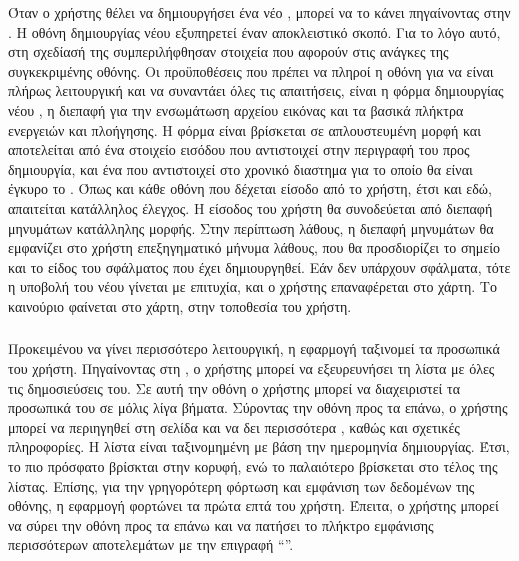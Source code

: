 Όταν ο χρήστης θέλει να δημιουργήσει ένα νέο , μπορεί να το κάνει πηγαίνοντας στην . Η οθόνη δημιουργίας νέου  εξυπηρετεί έναν αποκλειστικό σκοπό. Για το λόγο αυτό, στη σχεδίασή της συμπεριλήφθησαν στοιχεία που αφορούν στις ανάγκες της συγκεκριμένης οθόνης.
\newline
\indent
Οι προϋποθέσεις που πρέπει να πληροί η οθόνη για να είναι πλήρως λειτουργική και να συναντάει όλες τις απαιτήσεις, είναι η φόρμα δημιουργίας νέου , η διεπαφή για την ενσωμάτωση αρχείου εικόνας και τα βασικά πλήκτρα ενεργειών και πλοήγησης. Η φόρμα είναι βρίσκεται σε απλουστευμένη μορφή και αποτελείται από ένα στοιχείο εισόδου που αντιστοιχεί στην περιγραφή του  προς δημιουργία, και ένα  που αντιστοιχεί στο χρονικό διαστημα για το οποίο θα είναι έγκυρο το .
\newline
\indent
Όπως και κάθε οθόνη που δέχεται είσοδο από το χρήστη, έτσι και εδώ, απαιτείται κατάλληλος έλεγχος. Η είσοδος του χρήστη θα συνοδεύεται από διεπαφή μηνυμάτων κατάλληλης μορφής. Στην περίπτωση λάθους, η διεπαφή μηνυμάτων θα εμφανίζει στο χρήστη επεξηγηματικό μήνυμα λάθους, που θα προσδιορίζει το σημείο και το είδος του σφάλματος που έχει δημιουργηθεί. Εάν δεν υπάρχουν σφάλματα, τότε η υποβολή του νέου  γίνεται με επιτυχία, και ο χρήστης επαναφέρεται στο χάρτη. Το καινούριο  φαίνεται στο χάρτη, στην τοποθεσία του χρήστη.


\subsubsection{}
Προκειμένου να γίνει περισσότερο λειτουργική, η εφαρμογή ταξινομεί τα προσωπικά  του χρήστη. Πηγαίνοντας στη , ο χρήστης μπορεί να εξευρευνήσει τη λίστα με όλες τις δημοσιεύσεις του. Σε αυτή την οθόνη ο χρήστης μπορεί να διαχειριστεί τα προσωπικά του  σε μόλις λίγα βήματα. Σύροντας την οθόνη προς τα επάνω, ο χρήστης μπορεί να περιηγηθεί στη σελίδα και να δει περισσότερα , καθώς και σχετικές πληροφορίες. Η λίστα είναι ταξινομημένη με βάση την ημερομηνία δημιουργίας. Έτσι, το πιο πρόσφατο  βρίσκται στην κορυφή, ενώ το παλαιότερο βρίσκεται στο τέλος της λίστας. Επίσης, για την γρηγορότερη φόρτωση και εμφάνιση των δεδομένων της οθόνης, η εφαρμογή φορτώνει τα πρώτα επτά  του χρήστη. Έπειτα, ο χρήστης μπορεί να σύρει την οθόνη προς τα επάνω και να πατήσει το πλήκτρο εμφάνισης περισσότερων αποτελεμάτων με την επιγραφή  ``\textit{}''.

